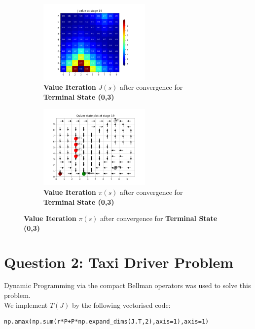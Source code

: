 \begin{figure}[h]
\begin{subfigure}
\centering
\includegraphics[angle=0,width=0.6\textwidth]{hw4/logs/value_iter_t=3_N=20/J-heatmap-19.png}
\caption{ \textbf{Value Iteration} $J(s)$  after convergence for \textbf{Terminal State (0,3)}}
\end{subfigure}

\begin{subfigure}
\centering
\includegraphics[angle=0,width=0.6\textwidth]{hw4/logs/value_iter_t=3_N=20/quiver-19.png}
\caption{ \textbf{Value Iteration}  $\pi(s)$ after convergence for \textbf{Terminal State (0,3)}}
\end{subfigure}
\end{figure}
\newpage
\section {Question 2: Taxi Driver Problem}

Dynamic Programming via the compact Bellman operators was used to solve this problem. \\

We implement $T(J)$ by the following vectorised code:
\begin{lstlisting}[numbers = none]
np.amax(np.sum(r*P+P*np.expand_dims(J.T,2),axis=1),axis=1)
\end{lstlisting}

